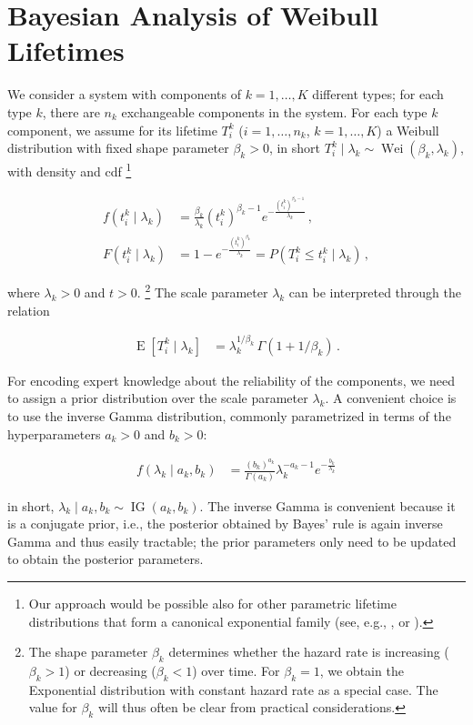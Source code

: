 \documentclass[Journal,SectionNumbers,SingleSpace,InsideFigs]{ascelike}
\newcommand{\E}{\operatorname{E}}
\newcommand{\wei}{\operatorname{Wei}} %
\newcommand{\ig}{\operatorname{IG}}   %
\begin{document}
\section{Bayesian Analysis of Weibull Lifetimes}
\label{sec:weibull}

We consider a system with components of $k=1,\ldots,K$ different types;
for each type $k$, there are $n_k$ exchangeable components in the system.
For each type $k$ component, we assume for its lifetime $T_i^k$ ($i=1,\ldots,n_k$, $k = 1, \ldots, K$)
a Weibull distribution with fixed shape parameter $\beta_k > 0$,
in short $T_i^k \mid \lambda_k \sim \wei(\beta_k,\lambda_k)$,
with density and cdf%
\footnote{Our approach would be possible also for other parametric lifetime distributions
that form a canonical exponential family
(see, e.g., , or ).}
\begin{linenomath*}
\begin{align}
\label{eq:weibulldens}
f(t_i^k \mid \lambda_k) &= \frac{\beta_k}{\lambda_k} (t_i^k)^{\beta_k-1} e^{-\frac{(t_i^k)^{\beta_k-1}}{\lambda_k}}\,, \\
\label{eq:weibullcdf}
F(t_i^k \mid \lambda_k) &= 1 - e^{-\frac{(t_i^k)^{\beta_k}}{\lambda_k}} = P(T_i^k \leq t_i^k \mid \lambda_k)\,,
\end{align}
\end{linenomath*}
where $\lambda_k > 0$ and $t > 0$.%
\footnote{The shape parameter $\beta_k$ determines whether the hazard rate is increasing ($\beta_k > 1$)
or decreasing ($\beta_k < 1$) over time.
For $\beta_k=1$, we obtain the Exponential distribution with constant hazard rate as a special case.
The value for $\beta_k$ will thus often be clear from practical considerations.}
The scale parameter $\lambda_k$ can be interpreted through the relation
\begin{linenomath*}
\begin{align}
\E[T_i^k \mid \lambda_k] &= \lambda_k^{1/\beta_k}\, \Gamma(1 + 1/\beta_k)\,.
\label{eq:lambdainterpret}
\end{align}
\end{linenomath*}
For encoding expert knowledge about the reliability of the components,
we need to assign a prior distribution over the scale parameter $\lambda_k$.
A convenient choice is to use the inverse Gamma distribution,
commonly parametrized in terms of the hyperparameters $a_k > 0$ and $b_k > 0$:
\begin{linenomath*}
\begin{align}
f(\lambda_k\mid a_k,b_k) &= \frac{(b_k)^{a_k}}{\Gamma(a_k)} \lambda_k^{-a_k -1} e^{-\frac{b_k}{\lambda_k}}
\label{eq:ig-def}
\end{align}
\end{linenomath*}
in short, $\lambda_k \mid a_k, b_k \sim \ig(a_k,b_k)$.
The inverse Gamma is convenient because it is a conjugate prior,
i.e., the posterior obtained by Bayes' rule is again inverse Gamma and thus easily tractable;
the prior parameters only need to be updated to obtain the posterior parameters.
\end{document}
